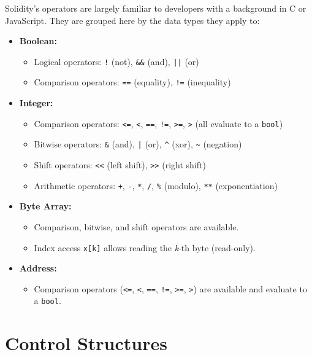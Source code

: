 \documentclass{scrbook}
\begin{document}
Solidity's operators are largely familiar to developers with a background in C or JavaScript. They are grouped here by the data types they apply to:

\begin{itemize}
    \item \textbf{Boolean:}
    \begin{itemize}
        \item Logical operators: \texttt{!} (not), \texttt{\&\&} (and), \texttt{||} (or)
        \item Comparison operators: \texttt{==} (equality), \texttt{!=} (inequality)
    \end{itemize}
    
    \item \textbf{Integer:}
    \begin{itemize}
        \item Comparison operators: \texttt{<=}, \texttt{<}, \texttt{==}, \texttt{!=}, \texttt{>=}, \texttt{>} (all evaluate to a \texttt{bool})
        \item Bitwise operators: \texttt{\&} (and), \texttt{|} (or), \texttt{\textasciicircum} (xor), \texttt{\textasciitilde} (negation)
        \item Shift operators: \texttt{<<} (left shift), \texttt{>>} (right shift)
        \item Arithmetic operators: \texttt{+}, \texttt{-}, \texttt{*}, \texttt{/}, \texttt{\%} (modulo), \texttt{**} (exponentiation)
    \end{itemize}
    
    \item \textbf{Byte Array:}
    \begin{itemize}
        \item Comparison, bitwise, and shift operators are available.
        \item Index access \texttt{x[k]} allows reading the \textit{k}-th byte (read-only).
    \end{itemize}
    
    \item \textbf{Address:}
    \begin{itemize}
        \item Comparison operators (\texttt{<=}, \texttt{<}, \texttt{==}, \texttt{!=}, \texttt{>=}, \texttt{>}) are available and evaluate to a \texttt{bool}.
    \end{itemize}
\end{itemize}

\section{Control Structures}
\end{document}
